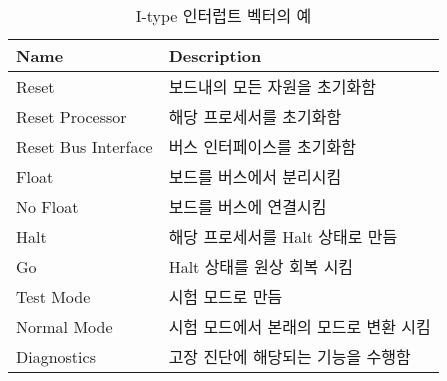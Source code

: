 %
%
\begin{table}[htbp]
\caption{I-type 인터럽트 벡터의 예}\label{table:i-type}
   \begin{center}
   \begin{tabular}{|l|l|} \hline
	Name & Description \\
\hline \hline
	Reset & 보드내의 모든 자원을 초기화함 \\
	Reset Processor & 해당 프로세서를 초기화함 \\
	Reset Bus Interface & 버스 인터페이스를 초기화함 \\
	Float & 보드를 버스에서 분리시킴 \\
	No Float & 보드를 버스에 연결시킴 \\
	Halt & 해당 프로세서를 Halt 상태로 만듬 \\
	Go & Halt 상태를 원상 회복 시킴 \\
	Test Mode & 시험 모드로 만듬 \\
	Normal Mode & 시험 모드에서 본래의 모드로 변환 시킴 \\
	Diagnostics & 고장 진단에 해당되는 기능을 수행함 \\
\hline
   \end{tabular}
   \end{center}
\end{table}
%
%
